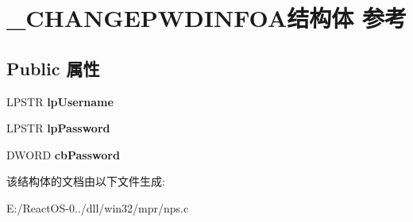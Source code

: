 \hypertarget{struct___c_h_a_n_g_e_p_w_d_i_n_f_o_a}{}\section{\+\_\+\+C\+H\+A\+N\+G\+E\+P\+W\+D\+I\+N\+F\+O\+A结构体 参考}
\label{struct___c_h_a_n_g_e_p_w_d_i_n_f_o_a}
\subsection*{Public 属性}
\begin{DoxyCompactItemize}
\item 
\mbox{\label{struct___c_h_a_n_g_e_p_w_d_i_n_f_o_a_a58810cc3ee13decb7dfcf786a0b1c5e6}} 
L\+P\+S\+TR {\bfseries lp\+Username}
\item 
\mbox{\label{struct___c_h_a_n_g_e_p_w_d_i_n_f_o_a_af67a108f5501199d2ef849c9f73eca32}} 
L\+P\+S\+TR {\bfseries lp\+Password}
\item 
\mbox{\label{struct___c_h_a_n_g_e_p_w_d_i_n_f_o_a_a38ee791049e44e53b32cd50a533eab27}} 
D\+W\+O\+RD {\bfseries cb\+Password}
\end{DoxyCompactItemize}


该结构体的文档由以下文件生成\+:\begin{DoxyCompactItemize}
\item 
E\+:/\+React\+O\+S-\/0../dll/win32/mpr/nps.\+c\end{DoxyCompactItemize}
